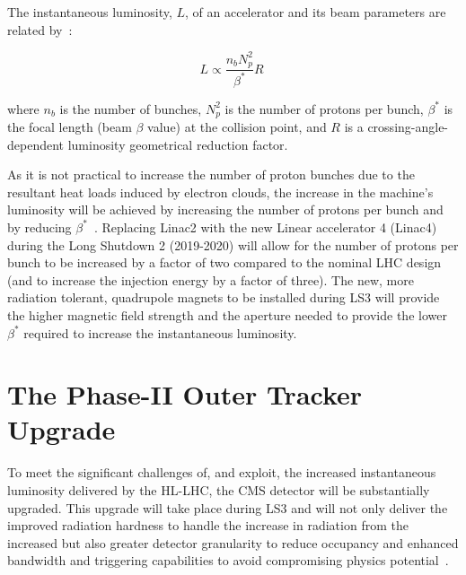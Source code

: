 The instantaneous luminosity, $L$, of an accelerator and its beam parameters are related by~\cite{ApollinariG.:2017ojx}: 

\begin{equation}
L \propto \frac{n_{b}N^{2}_{p}}{\beta^{*}} R  \;
\label{eq:machineLumi}
\end{equation}

where $n_{b}$ is the number of bunches, $N^{2}_{p}$ is the number of protons per bunch, $\beta^{*}$ is the focal length (beam $\beta$ value) at the collision point, and $R$ is a crossing-angle-dependent luminosity geometrical reduction factor.

As it is not practical to increase the number of proton bunches due to the resultant heat loads induced by electron clouds, the increase in the machine's luminosity will be achieved by increasing the number of protons per bunch and by reducing $\beta^{*}$~\cite{ApollinariG.:2017ojx}.
Replacing Linac2 with the new Linear accelerator 4 (Linac4)~\cite{linac4} during the Long Shutdown 2 (2019-2020) will allow for the number of protons per bunch to be increased by a factor of two compared to the nominal LHC design (and to increase the injection energy by a factor of three).
The new, more radiation tolerant, quadrupole magnets to be installed during LS3 will provide the higher magnetic field strength and the aperture needed to provide the lower $\beta^{*}$ required to increase the instantaneous luminosity. 

\section{The Phase-II Outer Tracker Upgrade}\label{sec:tk-upgrade}
To meet the significant challenges of, and exploit, the increased instantaneous luminosity delivered by the HL-LHC, the CMS detector will be substantially upgraded.
This upgrade will take place during LS3 and will not only deliver the improved radiation hardness to handle the increase in radiation from the increased \PU but also greater detector granularity to reduce occupancy and enhanced bandwidth and triggering capabilities to avoid compromising physics potential~\cite{P2TrackerTDR,CMSCollaboration:2015zni}.

